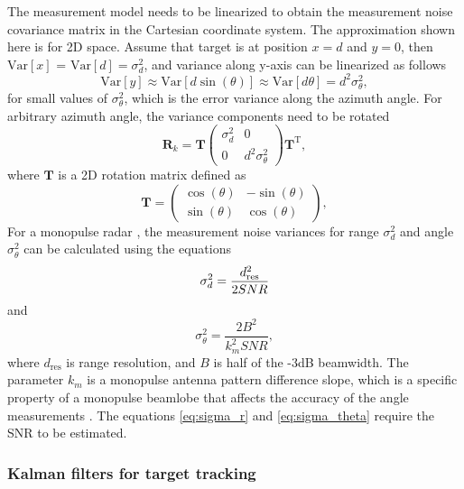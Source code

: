 \documentclass[english, 12pt, a4paper, elec, utf8, a-1b, online]{aaltothesis}
\renewcommand{\vec}[1]{\mathbf{#1}}
\newcommand{\ocov}{\vec{R}_k}
\newcommand{\transpose}[1]{#1^\text{T}}
\newcommand{\rotmat}{\mathbf{T}}
\newcommand{\Var}[1]{\text{Var}\left[ #1 \right]}
\begin{document}
The measurement model needs to be linearized to obtain the measurement noise covariance matrix in the Cartesian coordinate system.
The approximation shown here is for 2D space.
Assume that target is at position $x=d$ and $y=0$, then $\Var{x}$ = $\Var{d} = \sigma_d^2$, and variance along y-axis can be linearized as follows
\begin{equation*}
    \Var{y} \approx \Var{d \sin\left(\theta\right)} \approx \Var{d \theta} = d^2\sigma_\theta^2,
\end{equation*} 
for small values of $\sigma_\theta^2$, which is the error variance along the azimuth angle.
For arbitrary azimuth angle, the variance components need to be rotated
\begin{equation} \label{eq:cartesian_measurement_covariance}
    \ocov = \rotmat 
    \begin{pmatrix}
            \sigma_d^2 & 0 \\
            0 & d^2 \sigma_\theta^2
    \end{pmatrix}
    \transpose{\rotmat},
\end{equation}
where $\rotmat$ is a 2D rotation matrix defined as
\begin{equation}
    \rotmat = 
    \begin{pmatrix}
            \cos(\theta) & -\sin(\theta) \\
            \sin(\theta) & \cos(\theta)
    \end{pmatrix},
\end{equation}
For a monopulse radar \cite{Sherman2011}, the measurement noise variances for range $\sigma_d^2$ and angle $\sigma_\theta^2$ can be calculated using the equations \cite{Curry2011}
\begin{equation}
    \sigma_d^2 =  \frac{d_\text{res}^2}{2 SNR}  \label{eq:sigma_r}\\
\end{equation}
and
\begin{equation}
    \sigma_\theta^2 =  \frac{2 B^2}{k_m^2 SNR} \label{eq:sigma_theta},
\end{equation}
where $d_\text{res}$ is range resolution, and $B$ is half of the -3dB beamwidth. 
The parameter $k_m$ is a monopulse antenna pattern difference slope, which is a specific property of a monopulse beamlobe that affects the accuracy of the angle measurements \cite{Sherman2011}.
The equations \eqref{eq:sigma_r} and \eqref{eq:sigma_theta} require the SNR to be estimated.

\subsubsection{Kalman filters for target tracking} \label{sec:kalman_filter}
\end{document}
